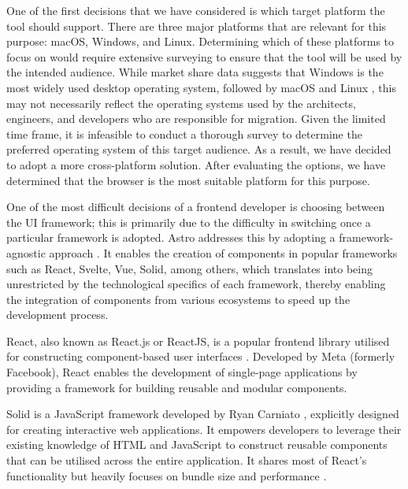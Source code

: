 One of the first decisions that we have considered is which target platform the
tool should support. There are three major platforms that are relevant for this
purpose: macOS, Windows, and Linux. Determining which of these platforms to
focus on would require extensive surveying to ensure that the tool will be used
by the intended audience. While market share data suggests that Windows is the
most widely used desktop operating system, followed by macOS and Linux
\cite{desktop-usage-worldwide}, this may not necessarily reflect the operating
systems used by the architects, engineers, and developers who are responsible
for migration. Given the limited time frame, it is infeasible to conduct a
thorough survey to determine the preferred operating system of this target
audience. As a result, we have decided to adopt a more cross-platform solution.
After evaluating the options, we have determined that the browser is the most
suitable platform for this purpose.

One of the most difficult decisions of a frontend developer is choosing between
the UI framework; this is primarily due to the difficulty in switching once a
particular framework is adopted. Astro addresses this by adopting a
framework-agnostic approach \cite{astro}. It enables the creation of components
in popular frameworks such as React, Svelte, Vue, Solid, among others, which
translates into being unrestricted by the technological specifics of each
framework, thereby enabling the integration of components from various
ecosystems to speed up the development process.

React, also known as React.js or ReactJS, is a popular frontend library
utilised for constructing component-based user interfaces \cite{react-ui}.
Developed by Meta (formerly Facebook), React enables the development of
single-page applications by providing a framework for building reusable and
modular components.

Solid is a JavaScript framework developed by Ryan Carniato \cite{solid},
explicitly designed for creating interactive web applications. It empowers
developers to leverage their existing knowledge of HTML and JavaScript to
construct reusable components that can be utilised across the entire
application. It shares most of React's functionality but heavily focuses on
bundle size and performance \cite{solid}.
